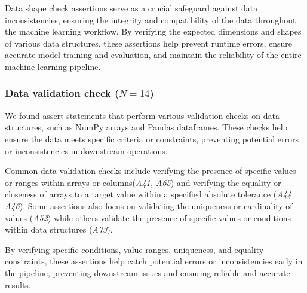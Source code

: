 Data shape check assertions serve as a crucial safeguard against data inconsistencies, ensuring the integrity and compatibility of the data throughout the machine learning workflow. By verifying the expected dimensions and shapes of various data structures, these assertions help prevent runtime errors, ensure accurate model training and evaluation, and maintain the reliability of the entire machine learning pipeline.


\subsubsection{Data validation check ($N = 14$)}

We found assert statements that perform various validation checks on data structures, such as NumPy arrays and Pandas dataframes. These checks help ensure the data meets specific criteria or constraints, preventing potential errors or inconsistencies in downstream operations.

Common data validation checks include verifying the presence of specific values or ranges within arrays or columns(\emph{A41, A65}) and verifying the equality or closeness of arrays to a target value within a specified absolute tolerance (\emph{A44, A46}). Some assertions also focus on validating the uniqueness or cardinality of values (\emph{A52}) while others validate the presence of specific values or conditions within data structures (\emph{A73}).

By verifying specific conditions, value ranges, uniqueness, and equality constraints, these assertions help catch potential errors or inconsistencies early in the pipeline, preventing downstream issues and ensuring reliable and accurate results.


